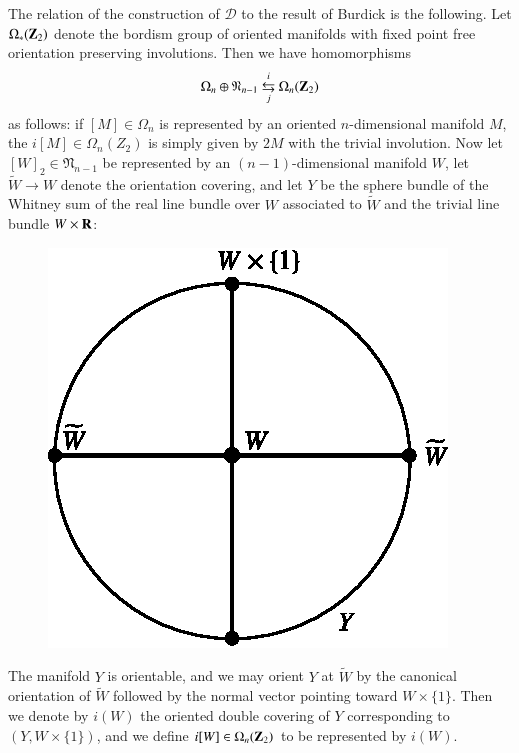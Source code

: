 The relation of the construction of $\mathscr{D}$ to the result of Burdick is the following. Let $\Omega_{*}(\mathbf{Z}_{2})$ denote the bordism group of oriented manifolds with fixed point free orientation preserving involutions. Then we have homomorphisms
$$
\Omega_{n}\oplus \mathfrak{N}_{n-1}~{\displaystyle{\mathop{\leftrightarrows}_{j}^{i}}}~ \Omega_{n}(\mathbf{Z}_{2})
$$
as follows: if $[M]\in \Omega_{n}$ is represented by an oriented $n$-dimensional manifold $M$, the $i[M]\in \Omega_{n}(Z_{2})$ is simply given by $2M$ with the trivial involution. Now let $[W]_{2}\in \mathfrak{N}_{n-1}$ be represented by an $(n-1)$-dimensional manifold $W$, let $\widetilde{W}\to W$ denote the orientation covering, and let $Y$ be the sphere bundle of the Whitney sum of the real line bundle over $W$ associated to $\widetilde{W}$ and the trivial line bundle $W\times \mathbf{R}$:
\begin{figure}[H]
\centering
\includegraphics{figures/fig6.eps}
\end{figure}\pageoriginale
\noindent
The manifold $Y$ is orientable, and we may orient $Y$ at $\widetilde{W}$ by the canonical orientation of $\widetilde{W}$ followed by the normal vector pointing toward $W\times \{1\}$. Then we denote by $i(W)$ the oriented double covering of $Y$ corresponding to $(Y,W\times \{1\})$, and we define $i[W]\in \Omega_{n}(\mathbf{Z}_{2})$ to be represented by $i(W)$.

